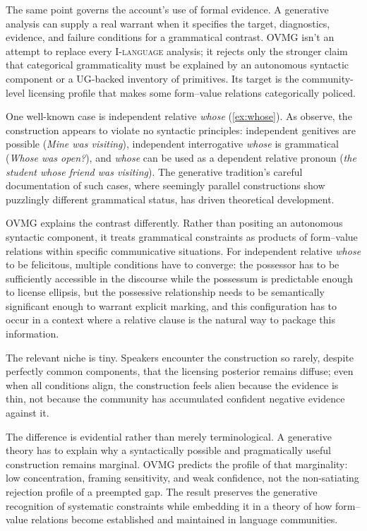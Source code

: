 \documentclass[12pt,letterpaper]{article}
\newcommand{\term}[1]{\textsc{#1}}
\newcommand{\mention}[1]{\textit{#1}}
\begin{document}
The same point governs the account's use of formal evidence. A
generative analysis can supply a real warrant when it specifies the target,
diagnostics, evidence, and failure conditions for a grammatical contrast. OVMG
isn't an attempt to replace every \term{I-language} analysis; it rejects only the
stronger claim that categorical grammaticality must be explained by an autonomous
syntactic component or a UG-backed inventory of primitives. Its target is the
community-level licensing profile that makes some form--value relations
categorically policed.

One well-known case is independent relative \mention{whose} (\ref{ex:whose}). As
\textcite{hankamer1973whose} observe, the construction appears to violate no
syntactic principles: independent genitives are possible (\mention{Mine was
visiting}), independent interrogative \mention{whose} is grammatical
(\mention{Whose was open?}), and \mention{whose} can be used as a dependent
relative pronoun (\mention{the student whose friend was visiting}). The
generative tradition's careful documentation of such cases, where seemingly
parallel constructions show puzzlingly different grammatical status, has driven
theoretical development.

OVMG explains the contrast differently. Rather than positing an autonomous
syntactic component, it treats grammatical constraints as products of form--value
relations within specific communicative situations. For independent relative
\mention{whose} to be felicitous, multiple conditions have to converge: the
possessor has to be sufficiently accessible in the discourse while
the possessum is predictable enough to license ellipsis, but the possessive
relationship needs to be semantically significant enough to warrant explicit
marking, and this configuration has to occur in a context where a relative clause
is the natural way to package this information.

The relevant niche is tiny. Speakers encounter the construction so rarely, despite perfectly common
components, that the licensing posterior remains diffuse; even when all
conditions align, the construction feels alien because the evidence is thin, not
because the community has accumulated confident negative evidence against it.

The difference is evidential rather than merely terminological. A generative
theory has to explain why a syntactically possible and pragmatically useful
construction remains marginal. OVMG predicts the profile of that marginality:
low concentration, framing sensitivity, and weak confidence, not the
non-satiating rejection profile of a preempted gap. The result preserves the
generative recognition of systematic constraints while embedding it in a theory
of how form--value relations become established and maintained in language
communities.
\end{document}

